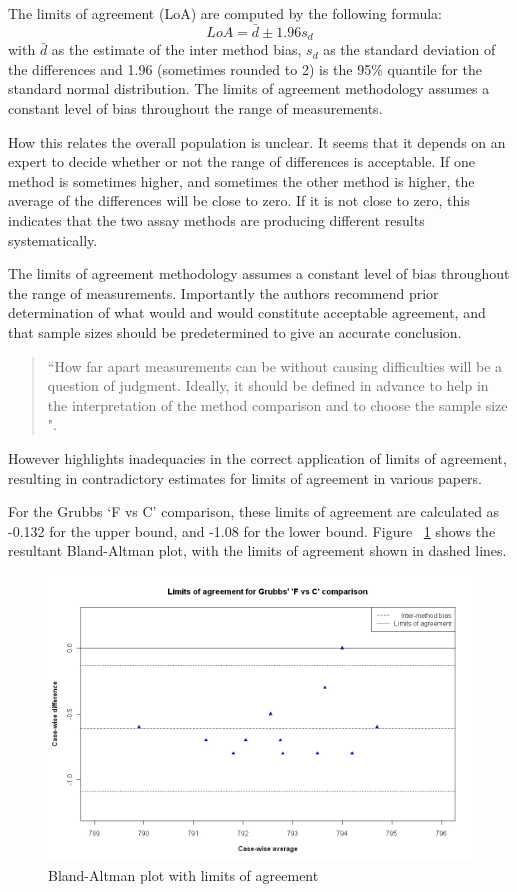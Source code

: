 \documentclass[12pt, a4paper]{report}
\theoremstyle{plain}
\theoremstyle{definition}
\theoremstyle{remark}
\begin{document}
	
	The limits of agreement (LoA) are computed by the following
	formula:
	\[
	LoA = \bar{d} \pm 1.96 s_{d}
	\]
	with $\bar{d}$ as the estimate of the inter method bias, $s_{d}$
	as the standard deviation of the differences and 1.96 (sometimes rounded to 2) is the 95\%
	quantile for the standard normal distribution. The limits of agreement methodology assumes a constant level of bias throughout the range of measurements.
	
	How this relates the overall population is unclear. It seems that it depends on an expert to decide whether or not the range of
	differences is acceptable. 
	If one method is sometimes higher, and sometimes the other method is higher, the average of the differences will be close to zero.
	If it is not close to zero, this indicates that the two assay methods are producing different results systematically.
	
The limits of agreement methodology assumes a constant level of bias throughout the range of measurements. Importantly the authors recommend prior determination of what would and would constitute acceptable
agreement, and that sample sizes should be predetermined to give an accurate conclusion. 

\begin{quote}
	``How far apart measurements can be without causing difficulties
	will be a question of judgment. Ideally, it should be defined in
	advance to help in the interpretation of the method comparison and
	to choose the sample size \citep{BA86}".
\end{quote}

However \citet{mantha} highlights inadequacies in the correct application of limits of agreement, resulting in contradictory estimates for limits of agreement in various papers.

For the Grubbs `F vs C' comparison, these limits
of agreement are calculated as -0.132 for the upper bound, and
-1.08 for the lower bound. Figure ~\ref{GrubbsBAplot-noLOA} shows the resultant
Bland-Altman plot, with the limits of agreement shown in dashed
lines.


\begin{figure}[h!]
	\begin{center}
		\includegraphics[width=125mm]{images/GrubbsBAplot-LOA.jpeg}
		\caption{Bland-Altman plot with limits of agreement}\label{GrubbsBAplot-noLOA}
	\end{center}
\end{figure}
\newpage
\end{document}
